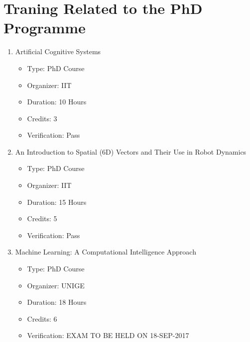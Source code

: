 \documentclass[12pt,a4paper]{report}
\begin{document}
\renewcommand{\bibsection}{\subsection{\bibname}}
\renewcommand{\bibname}{\large{References}}



\section{Traning Related to the PhD Programme}
\begin{enumerate}
    \item Artificial Cognitive Systems
    \begin{itemize}
		\item Type: PhD Course
		\item Organizer: IIT
		\item Duration: 10 Hours
		\item Credits: 3
		\item Verification: Pass
	\end{itemize}
	\item An Introduction to Spatial (6D) Vectors and Their Use in Robot Dynamics
	\begin{itemize}
		\item Type: PhD Course
		\item Organizer: IIT
		\item Duration: 15 Hours
		\item Credits: 5
		\item Verification: Pass
	\end{itemize}
	\item Machine Learning: A Computational Intelligence Approach
	\begin{itemize}
		\item Type: PhD Course
		\item Organizer: UNIGE
		\item Duration: 18 Hours
		\item Credits: 6
		\item Verification: EXAM TO BE HELD ON 18-SEP-2017
	\end{itemize}
\end{enumerate}
\end{document}
